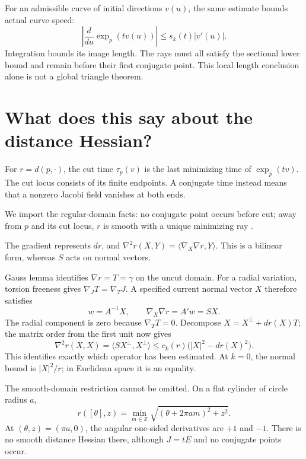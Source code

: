 \documentclass[12pt,reqno]{amsart}
\begin{document}
For an admissible curve of initial directions \(v(u)\), the same estimate bounds actual curve speed:
\[
\left|\frac d{du}\exp_p(tv(u))\right|
\le s_k(t)|v'(u)|.
\]
Integration bounds its image length. The rays must all satisfy the sectional lower bound and remain before their first conjugate point. This local length conclusion alone is not a global triangle theorem.

\section{What does this say about the distance Hessian?}
\label{sec:hessian}

For \(r=d(p,\cdot)\), the cut time \(\tau_p(v)\) is the last minimizing time of \(\exp_p(tv)\). The cut locus consists of its finite endpoints. A conjugate time instead means that a nonzero Jacobi field vanishes at both ends.

We import the regular-domain facts: no conjugate point occurs before cut; away from \(p\) and its cut locus, \(r\) is smooth with a unique minimizing ray \cite[Section 5]{S-Eschenburg-1994}.

The gradient represents \(dr\), and \(\nabla^2r(X,Y)=\langle\nabla_X\nabla r,Y\rangle\). This is a bilinear form, whereas \(S\) acts on normal vectors.

\begin{samepage}
\begin{theorem}
\label{thm:hessian}

\end{theorem}
\end{samepage}

Gauss lemma identifies \(\nabla r=T=\dot\gamma\) on the uncut domain. For a radial variation, torsion freeness gives \(\nabla_JT=\nabla_TJ\). A specified current normal vector \(X\) therefore satisfies
\[
w=A^{-1}X,\qquad \nabla_X\nabla r=A'w=SX.
\]
The radial component is zero because \(\nabla_TT=0\). Decompose \(X=X^\perp+dr(X)T\); the matrix order from the first unit now gives
\[
\nabla^2r(X,X)=\langle SX^\perp,X^\perp\rangle
\le c_k(r)\bigl(|X|^2-dr(X)^2\bigr).
\]
This identifies exactly which operator has been estimated. At \(k=0\), the normal bound is \(|X|^2/r\); in Euclidean space it is an equality.

The smooth-domain restriction cannot be omitted. On a flat cylinder of circle radius \(a\),
\[
r([\theta],z)=\min_{m\in\mathbb Z}
\sqrt{(\theta+2\pi am)^2+z^2}.
\]
At \((\theta,z)=(\pi a,0)\), the angular one-sided derivatives are \(+1\) and \(-1\). There is no smooth distance Hessian there, although \(J=tE\) and no conjugate points occur.
\end{document}
